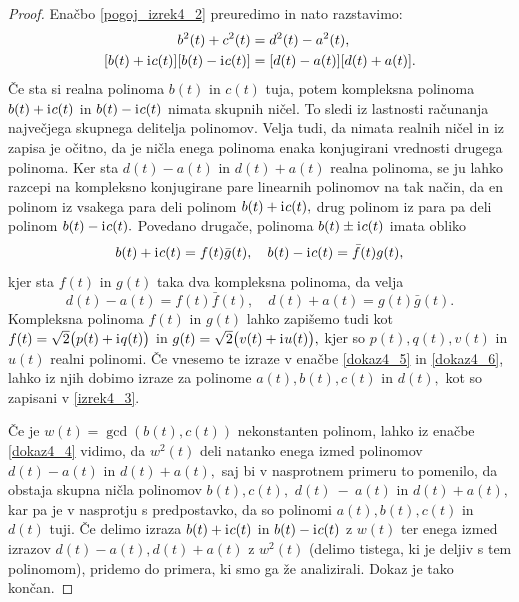 \documentclass[12pt,a4paper,twoside]{article}
\newcommand{\iu}{\mathrm{i}\mkern1mu} %
\theoremstyle{definition} %
\theoremstyle{plain} %
\theoremstyle{primerstyle}
\numberwithin{equation}{section}  %
\begin{document}
\begin{proof}
	Enačbo \eqref{pogoj_izrek4_2} preuredimo in nato razstavimo:
	\begin{align}
		b^2(t)+c^2(t)&=d^2(t)-a^2(t), \nonumber \\
		[b(t)+\iu c(t)][b(t)-\iu c(t)]&=[d(t)-a(t)][d(t)+a(t)]. \label{dokaz4_4}
	\end{align}
	Če sta si realna polinoma $b(t)$ in $c(t)$ tuja, potem kompleksna polinoma $b(t)+\iu c(t)$ in $b(t)-\iu c(t)$ nimata skupnih ničel. To sledi iz lastnosti računanja največjega skupnega delitelja polinomov. Velja tudi, da nimata realnih ničel in iz zapisa je očitno, da je ničla enega polinoma enaka konjugirani vrednosti drugega polinoma. Ker sta $d(t)-a(t)$ in $d(t)+a(t)$ realna polinoma, se ju lahko razcepi na kompleksno konjugirane pare linearnih polinomov na tak način, da en polinom iz vsakega para deli polinom $b(t)+\iu c(t),$ drug polinom iz para pa deli polinom $b(t)-\iu c(t).$ Povedano drugače, polinoma $b(t) \pm \iu c(t)$ imata obliko
	\begin{equation}
	\label{dokaz4_5}
		b(t)+ \iu c(t)=f(t)\bar{g}(t), \quad b(t)-\iu c(t)=\bar{f}(t)g(t),
	\end{equation}
	kjer sta $f(t)$ in $g(t)$ taka dva kompleksna polinoma, da velja
	\begin{equation}
		\label{dokaz4_6}
		d(t)-a(t)=f(t)\bar{f}(t), \quad d(t)+a(t)=g(t)\bar{g}(t).
	\end{equation}
	Kompleksna polinoma $f(t)$ in $g(t)$ lahko zapišemo tudi kot $f(t)=\sqrt{2}\big(p(t)+\iu q(t)\big)$ in $g(t)=\sqrt{2}\big(v(t)+\iu u(t)\big),$ kjer so $p(t),q(t),v(t)$ in $u(t)$ realni polinomi. Če vnesemo te izraze v enačbe \eqref{dokaz4_5} in \eqref{dokaz4_6}, lahko iz njih dobimo izraze za polinome $a(t),b(t),c(t)$ in $d(t),$ kot so zapisani v \eqref{izrek4_3}.

	Če je $w(t)=\gcd(b(t),c(t))$ nekonstanten polinom, lahko iz enačbe \eqref{dokaz4_4} vidimo, da $w^2(t)$ deli natanko enega izmed polinomov $d(t)-a(t)$ in $d(t)+a(t),$ saj bi v nasprotnem primeru to pomenilo, da obstaja skupna ničla polinomov $b(t),c(t),$ $d(t)~-~a(t)$ in $d(t)+a(t),$ kar pa je v nasprotju s predpostavko, da so polinomi $a(t),b(t),c(t)$ in $d(t)$ tuji. Če delimo izraza $b(t)+\iu c(t)$ in $b(t)-\iu c(t)$ z $w(t)$ ter enega izmed izrazov $d(t)-a(t),d(t)+a(t)$ z $w^2(t)$ (delimo tistega, ki je deljiv s tem polinomom), pridemo do primera, ki smo ga že analizirali. Dokaz je tako končan. 
\end{proof}
\end{document}
